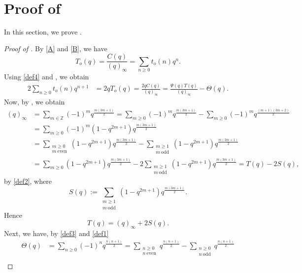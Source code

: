 \documentclass[12pt,reqno]{amsart}
\renewcommand{\(}{\left\(}
\renewcommand{\)}{\right\)}
\numberwithin{equation}{section}
\theoremstyle{plain}
\theoremstyle{definition}
\numberwithin{equation}{section}
\begin{document}
\section{Proof of }\label{sec2}

In this section, we prove .

\begin{proof}[Proof of ]
By \eqref{A} and \eqref{B}, we have
\begin{equation}\label{def4}
T_o(q)=\frac{C(q)}{(q)_{\infty}}=\sum_{n\ge 0}t_o(n)q^n.
\end{equation}
Using \eqref{def4} and , we obtain
\begin{align}\label{eqn1}
2\sum_{n\ge 0}t_o(n)q^{n+1}&=2qT_o(q)=\frac{2qC(q)}{(q)_{\infty}}%
=\frac{\Psi(q)T(q)}{(q)_{\infty}}-\Theta(q).
\end{align}
Now, by , we obtain
\begin{align*}
(q)_{\infty}&=\sum_{m\in \mathbb{Z}}(-1)^m q^{\frac{m(3m+1)}{2}}%
=\sum_{m\ge 0}(-1)^m q^{\frac{m(3m+1)}{2}}-\sum_{m\ge 0}(-1)^m q^{\frac{(m+1)(3m+2)}{2}}\\
&=\sum_{m\ge 0}(-1)^m\left(1-q^{2m+1}\right) q^{\frac{m(3m+1)}{2}}\\
&=\sum_{\substack{m\ge 0\\m\ \text{even}}}\left(1-q^{2m+1}\right) q^{\frac{m(3m+1)}{2}}-\sum_{\substack{m\ge 1\\m\ \text{odd}}}\left(1-q^{2m+1}\right) q^{\frac{m(3m+1)}{2}}\\
&=\sum_{m\ge 0}\left(1-q^{2m+1}\right) q^{\frac{m(3m+1)}{2}}-2\sum_{\substack{m\ge 1\\m\ \text{odd}}}\left(1-q^{2m+1}\right) q^{\frac{m(3m+1)}{2}}=T(q)-2S(q),
\end{align*}
by \eqref{def2}, where
\[
S(q):=\sum_{\substack{m\ge 1\\m\ \text{odd}}} \left(1-q^{2m+1}\right)q^{\frac{m(3m+1)}{2}}.
\]
Hence
\begin{equation}\label{eqn2}
T(q)=(q)_{\infty}+2S(q).
\end{equation}
Next, we have, by \eqref{def3} and \eqref{def1}
\begin{align}\label{eqn3}
\Theta(q)&=\sum_{n\ge 0}(-1)^n q^{\frac{n(n+1)}{2}}=\sum_{\substack{n\ge 0\\n\ \text{even}}} q^{\frac{n(n+1)}{2}}-\sum_{\substack{n\ge 0\\n\ \text{odd}}} q^{\frac{n(n+1)}{2}}\nonumber\\

\end{align}
\end{proof}
\end{document}
